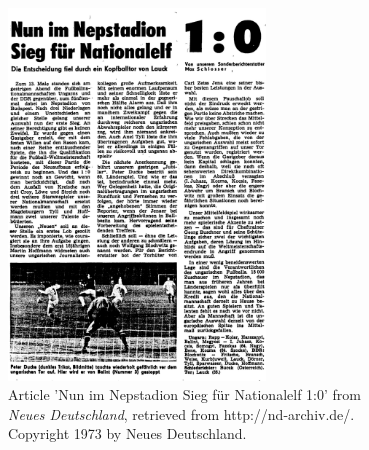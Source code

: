 \documentclass[unknownkeysallowed,usepdftitle=false,aspectratio=169, parskip=full]{beamer}
\newcommand{\secvariable}{nothing}
\newcommand{\mysection}[1]{\renewcommand{\secvariable}{#1}
}
\begin{document}
\mysection{slab}
\begin{frame}\label{\secvariable}
  \begin{columns}[t]
  \begin{column}[c]{0.45\textwidth}
\begin{figure}[h]
\centering
\includegraphics[width=0.7\textwidth,height=0.7\textheight,keepaspectratio]{figure/nun.png}
\caption{Article 'Nun im Nepstadion Sieg für Nationalelf 1:0' from \textit{Neues Deutschland}, retrieved from http://nd-archiv.de/. Copyright 1973 by Neues Deutschland.}
\end{figure}
    \end{column}
    \begin{column}[c]{0.45\textwidth}
    \begin{figure}[h]
\centering

\end{figure}
\end{column}
\end{columns}
\end{frame}
\end{document}

